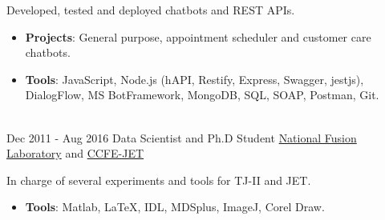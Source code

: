 \documentclass[letterpaper]{twentysecondcv} %
\begin{document}
\begin{twenty}
        {}
        {
        {
        Developed, tested and deployed chatbots and REST APIs.
        \begin{itemize}
            \item \textbf{Projects}: General purpose, appointment scheduler and customer care chatbots.
            \item \textbf{Tools}: JavaScript, Node.js (hAPI, Restify, Express, Swagger, jestjs), DialogFlow, MS BotFramework, MongoDB, SQL, SOAP, Postman, Git.
        \end{itemize}}
        }
     \\
     \twentyitem
   		{Dec 2011 -}
		{Aug 2016}
        {Data Scientist and Ph.D Student}
        {\href{http://www.fusion.ciemat.es/home/}{National Fusion Laboratory} and \href{https://www.euro-fusion.org/devices/jet/}{CCFE-JET}}
        {}
        {
        In charge of several experiments and tools for TJ-II and JET.
        \begin{itemize}
            \item \textbf{Tools}: Matlab, \LaTeX, IDL, MDSplus, ImageJ, Corel Draw.
        \end{itemize}
    	}
        
\end{twenty}

\end{document}
